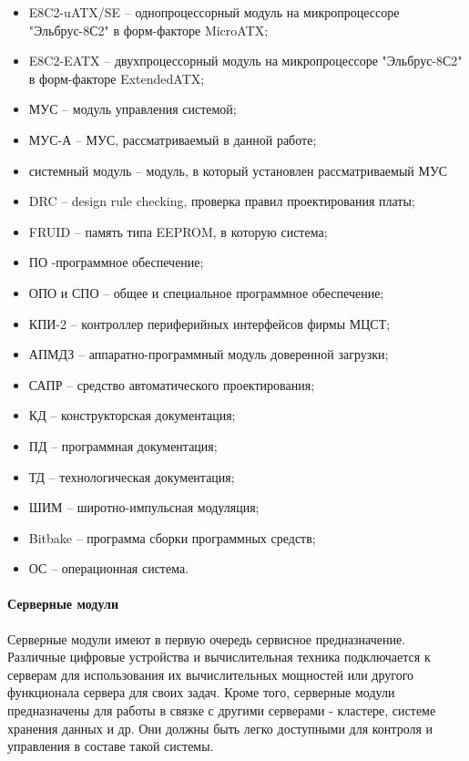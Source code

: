  \label{perechen}
\vspace{\baselineskip}


\begin{itemize}
	\item E8C2-uATX/SE -- однопроцессорный модуль на микропроцессоре "Эльбрус-8С2" в форм-факторе MicroATX;
	\item E8C2-EATX -- двухпроцессорный модуль на микропроцессоре "Эльбрус-8С2" в форм-факторе ExtendedATX;
	\item МУС -- модуль управления системой;
	\item МУС-А -- МУС, рассматриваемый в данной работе;
	\item системный модуль -- модуль, в который установлен рассматриваемый МУС
	\item DRC -- design rule checking, проверка правил проектирования платы;
	\item FRUID -- память типа EEPROM, в которую система;
	\item ПО -программное обеспечение;
	\item ОПО и СПО -- общее и специальное программное обеспечение;
	\item КПИ-2 -- контроллер периферийных интерфейсов фирмы МЦСТ;
	\item АПМДЗ -- аппаратно-программный модуль доверенной загрузки;
	\item САПР -- средство автоматического проектирования;
	\item КД -- конструкторская документация;
	\item ПД -- программная документация;
	\item ТД -- технологическая документация;
	\item ШИМ -- широтно-импульсная модуляция;
	\item Bitbake -- программа сборки программных средств;
	\item ОС -- операционная система.
\end{itemize}
 


\clearpage


\paragraph{Серверные модули}

Серверные модули имеют в первую очередь сервисное предназначение. Различные цифровые устройства и вычислительная техника подключается к серверам для использования их вычислительных мощностей или другого функционала сервера для своих задач. \cite{windows_server_app} 
Кроме того, серверные модули предназначены для работы в связке с другими серверами - кластере, системе хранения данных и др. Они должны быть легко доступными для контроля и управления в составе такой системы.

